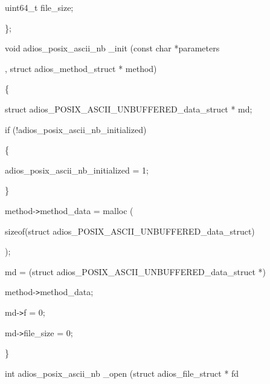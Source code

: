 \vspace{10pt}
uint64\_t file\_size;

\vspace{10pt}
\parindent=0pt
\};

\vspace{23pt}
void {\color{color02} adios\_posix\_ascii\_nb \_init} {\color{color02} (const char 
*parameters}

\vspace{10pt}
\parindent=183pt
{\color{color02} , struct adios\_method\_struct * method) }

\vspace{10pt}
\parindent=0pt
\{

\vspace{10pt}
\parindent=14pt
struct adios\_POSIX\_ASCII\_UNBUFFERED\_data\_struct * md;

\vspace{10pt}
if (!adios\_posix\_ascii\_nb\_initialized)

\vspace{10pt}
\parindent=28pt
\{

\vspace{10pt}
adios\_posix\_ascii\_nb\_initialized = 1;

\vspace{10pt}
\parindent=43pt
\}

\vspace{10pt}
\parindent=14pt
method-\texttt{>}method\_data = malloc (

\vspace{10pt}
\parindent=147pt
sizeof(struct adios\_POSIX\_ASCII\_UNBUFFERED\_data\_struct)

\vspace{10pt}
\parindent=237pt
);

\vspace{10pt}
\parindent=14pt
md = (struct adios\_POSIX\_ASCII\_UNBUFFERED\_data\_struct *) 

\vspace{10pt}
\parindent=165pt
method-\texttt{>}method\_data;      

\vspace{10pt}
\parindent=14pt
md-\texttt{>}f = 0;

\vspace{10pt}
md-\texttt{>}file\_size = 0;

\vspace{10pt}
\}

\vspace{23pt}
int {\color{color02} adios\_posix\_ascii\_nb \_open (struct adios\_file\_struct 
* fd}

